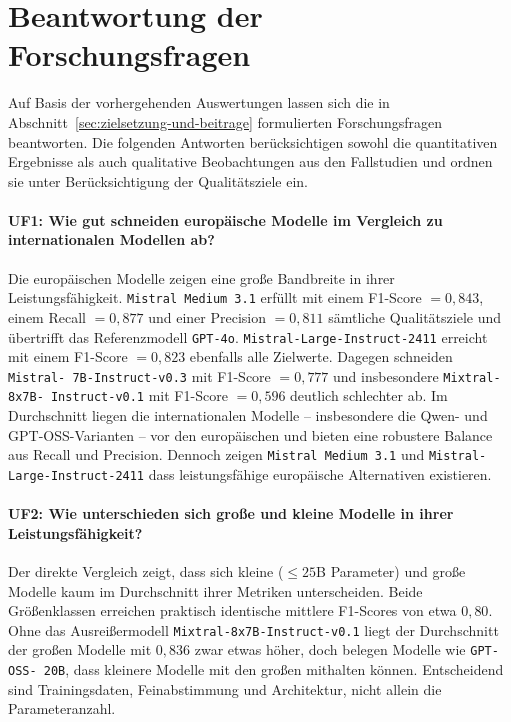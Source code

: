 \section{Beantwortung der Forschungsfragen}\label{sec:antworten-auf-forschungsfragen}

Auf Basis der vorhergehenden Auswertungen lassen sich die in Abschnitt~\ref{sec:zielsetzung-und-beitrage} formulierten Forschungsfragen beantworten. Die folgenden Antworten berücksichtigen sowohl die quantitativen Ergebnisse als auch qualitative Beobachtungen aus den Fallstudien und ordnen sie unter Berücksichtigung der Qualitätsziele ein.

\paragraph{UF1: Wie gut schneiden europäische Modelle im Vergleich zu internationalen Modellen ab?}

Die europäischen Modelle zeigen eine große Bandbreite in ihrer Leistungsfähigkeit. \texttt{Mistral Medium 3.1} erfüllt mit einem F1-Score $= 0{,}843$, einem Recall $= 0{,}877$ und einer Precision $= 0{,}811$ sämtliche Qualitätsziele und übertrifft das Referenzmodell \texttt{GPT-4o}. \texttt{Mistral-Large-Instruct-2411} erreicht mit einem F1-Score $= 0{,}823$ ebenfalls alle Zielwerte. Dagegen schneiden \texttt{Mistral-\linebreak~7B-Instruct-v0.3} mit F1-Score $= 0{,}777$ und insbesondere \texttt{Mixtral-8x7B-\linebreak~Instruct-v0.1} mit F1-Score $= 0{,}596$ deutlich schlechter ab. Im Durchschnitt liegen die internationalen Modelle – insbesondere die Qwen- und GPT-OSS-Varianten – vor den europäischen und bieten eine robustere Balance aus Recall und Precision. Dennoch zeigen \texttt{Mistral Medium 3.1} und \texttt{Mistral-Large-Instruct-2411} dass leistungsfähige europäische Alternativen existieren.

\paragraph{UF2: Wie unterschieden sich große und kleine Modelle in ihrer Leistungsfähigkeit?}

Der direkte Vergleich zeigt, dass sich kleine ($\leq 25$B Parameter) und große Modelle kaum im Durchschnitt ihrer Metriken unterscheiden. Beide Größenklassen erreichen praktisch identische mittlere F1-Scores von etwa $0{,}80$. Ohne das Ausreißermodell \texttt{Mixtral-8x7B-Instruct-v0.1} liegt der Durchschnitt der großen Modelle mit $0{,}836$ zwar etwas höher, doch belegen Modelle wie \texttt{GPT-OSS-\linebreak~20B}, dass kleinere Modelle mit den großen mithalten können. Entscheidend sind Trainingsdaten, Feinabstimmung und Architektur, nicht allein die Parameteranzahl.

